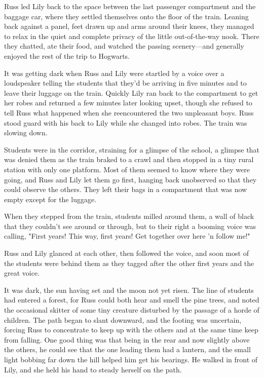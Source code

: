 Russ led Lily back to the space between the last passenger compartment and the baggage car, where they settled themselves onto the floor of the train. Leaning back against a panel, feet drawn up and arms around their knees, they managed to relax in the quiet and complete privacy of the little out-of-the-way nook. There they chatted, ate their food, and watched the passing scenery—and generally enjoyed the rest of the trip to Hogwarts.

It was getting dark when Russ and Lily were startled by a voice over a loudspeaker telling the students that they'd be arriving in five minutes and to leave their luggage on the train. Quickly Lily ran back to the compartment to get her robes and returned a few minutes later looking upset, though she refused to tell Russ what happened when she reencountered the two unpleasant boys. Russ stood guard with his back to Lily while she changed into robes. The train was slowing down.

Students were in the corridor, straining for a glimpse of the school, a glimpse that was denied them as the train braked to a crawl and then stopped in a tiny rural station with only one platform. Most of them seemed to know where they were going, and Russ and Lily let them go first, hanging back unobserved so that they could observe the others. They left their bags in a compartment that was now empty except for the luggage.

When they stepped from the train, students milled around them, a wall of black that they couldn't see around or through, but to their right a booming voice was calling, "First years! This way, first years! Get together over here 'n follow me!"

Russ and Lily glanced at each other, then followed the voice, and soon most of the students were behind them as they tagged after the other first years and the great voice.

It was dark, the sun having set and the moon not yet risen. The line of students had entered a forest, for Russ could both hear and smell the pine trees, and noted the occasional skitter of some tiny creature disturbed by the passage of a horde of children. The path began to slant downward, and the footing was uncertain, forcing Russ to concentrate to keep up with the others and at the same time keep from falling. One good thing was that being in the rear and now slightly above the others, he could see that the one leading them had a lantern, and the small light bobbing far down the hill helped him get his bearings. He walked in front of Lily, and she held his hand to steady herself on the path.

